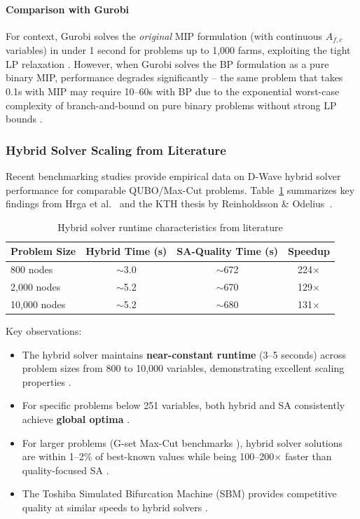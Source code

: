 \documentclass{oqireport}
\begin{document}
\paragraph{Comparison with Gurobi}

For context, Gurobi solves the \emph{original} MIP formulation (with continuous $A_{f,c}$ variables) in under 1 second for problems up to 1,000 farms, exploiting the tight LP relaxation \cite{gurobi2023}. However, when Gurobi solves the BP formulation as a pure binary MIP, performance degrades significantly -- the same problem that takes 0.1s with MIP may require 10--60s with BP due to the exponential worst-case complexity of branch-and-bound on pure binary problems without strong LP bounds \cite{wolsey1998integer, achterberg2007constraint}.

\subsubsection{Hybrid Solver Scaling from Literature}

Recent benchmarking studies provide empirical data on D-Wave hybrid solver performance for comparable QUBO/Max-Cut problems. Table~\ref{tab:hybrid_literature} summarizes key findings from Hrga et al.~\cite{hrga2024maxcut} and the KTH thesis by Reinholdsson \& Odelius~\cite{reinholdsson2023embedding}.

\begin{table}[H]
\centering
\caption{Hybrid solver runtime characteristics from literature}
\label{tab:hybrid_literature}
\begin{tabular}{@{}lccc@{}}
\toprule
\textbf{Problem Size} & \textbf{Hybrid Time (s)} & \textbf{SA-Quality Time (s)} & \textbf{Speedup} \\
\midrule
800 nodes & $\sim$3.0 & $\sim$672 & 224$\times$ \\
2,000 nodes & $\sim$5.2 & $\sim$670 & 129$\times$ \\
10,000 nodes & $\sim$5.2 & $\sim$680 & 131$\times$ \\
\bottomrule
\end{tabular}
\end{table}

Key observations:
\begin{itemize}
    \item The hybrid solver maintains \textbf{near-constant runtime} (3--5 seconds) across problem sizes from 800 to 10,000 variables, demonstrating excellent scaling properties \cite{hrga2024maxcut}.
    \item For specific problems below 251 variables, both hybrid and SA consistently achieve \textbf{global optima} \cite{hrga2024maxcut}.
    \item For larger problems (G-set Max-Cut benchmarks \cite{gset_benchmarks}), hybrid solver solutions are within 1--2\% of best-known values while being 100--200$\times$ faster than quality-focused SA \cite{hrga2024maxcut}.
    \item The Toshiba Simulated Bifurcation Machine (SBM) provides competitive quality at similar speeds to hybrid solvers \cite{goto2019combinatorial, toshiba_sbm}.
\end{itemize}
\end{document}
